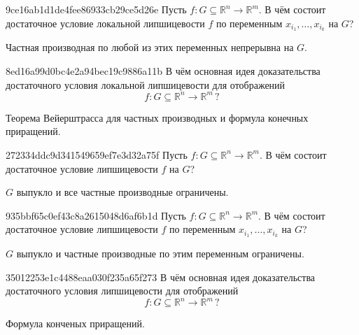 \begin{note}{9ce16ab1d1de4fee86933cb29ce5d26e}
    Пусть \({ f : G \subseteq \mathbb R^{n} \to \mathbb R^{m} }\).
    В чём состоит достаточное условие локальной липшицевости \({ f }\) по переменным \({ x_{i_1}, \ldots, x_{i_k} }\) на \({ G }\)?

    \begin{cloze}{1}
        Частная производная по любой из этих переменных непрерывна на \({ G }\).
    \end{cloze}
\end{note}

\begin{note}{8ed16a99d0bc4e2a94bec19c9886a11b}
    В чём основная идея доказательства достаточного условия локальной липшицевости для отображений
    \[
        f : G \subseteq \mathbb R^{n} \to \mathbb R^{m}\,?
    \]

    \begin{cloze}{1}
        Теорема Вейерштрасса для частных производных и формула конечных приращений.
    \end{cloze}
\end{note}

\begin{note}{272334ddc9d341549659ef7e3d32a75f}
    Пусть \({ f : G \subseteq \mathbb R^{n} \to \mathbb R^{m} }\).
    В чём состоит достаточное условие липшицевости \({ f }\) на \({ G }\)?

    \begin{cloze}{1}
        \({ G }\) выпукло и все частные производные ограничены.
    \end{cloze}
\end{note}

\begin{note}{935bbf65c0ef43c8a2615048d6af6b1d}
    Пусть \({ f : G \subseteq \mathbb R^{n} \to \mathbb R^{m} }\).
    В чём состоит достаточное условие липшицевости \({ f }\) по переменным \({ x_{i_1}, \ldots, x_{i_k} }\) на \({ G }\)?

    \begin{cloze}{1}
        \({ G }\) выпукло и частные производные по этим переменным ограничены.
    \end{cloze}
\end{note}

\begin{note}{35012253e1c4488eaa030f235a65f273}
    В чём основная идея доказательства достаточного условия липшицевости для отображений
    \[
        f : G \subseteq \mathbb R^{n} \to \mathbb R^{m}\,?
    \]

    \begin{cloze}{1}
        Формула конченых приращений.
    \end{cloze}
\end{note}


